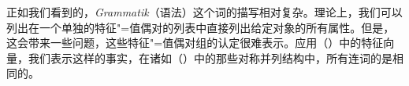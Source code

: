 正如我们看到的，\emph{Grammatik}（语法）这个词的描写相对复杂。理论上，我们可以列出在一个单独的特征"=值偶对的列表中直接列出给定对象的所有属性。但是，这会带来一些问题，这些特征"=值偶对组的认定很难表示。应用（）中的特征向量，我们表示这样的事实，在诸如（）中的那些对称并列结构中，所有连词的\catvs 是相同的。 \label{Seite-HPSG-Koordination}


